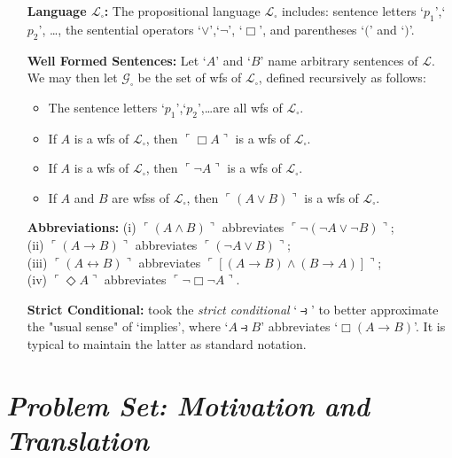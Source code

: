 \documentclass[a4paper, 11pt]{article} %
\newcommand{\corner}[1]{\ulcorner#1\urcorner} %
\renewcommand{\L}[0]{\mathcal{L}}
\begin{document}
\begin{enumerate}[leftmargin=1.2in,labelsep=.15in] 
\item[\bf Language $\boldsymbol{\L_\square}$:] The propositional language $\L_\square$ includes: sentence letters `$p_1$',`$p_2$', \dots, the sentential operators `$\vee$',`$\neg$', `$\Box$', and parentheses `$($' and `$)$'.
\item[\bf Well Formed Sentences:] Let `$A$' and `$B$' name arbitrary sentences of $\L$. We may then let $\mathcal{G}_\square$ be the set of wfs of $\L_\square$, defined recursively as follows:
\begin{itemize}
\item The sentence letters `$p_1$',`$p_2$',\dots are all wfs of $\L_\square$. 
\item If ${A}$ is a wfs of $\L_\square$, then $\corner{\Box A}$ is a wfs of $\L_\square$.
\item If ${A}$ is a wfs of $\L_\square$, then $\corner{\neg A}$ is a wfs of $\L_\square$.
\item If ${A}$ and ${B}$ are wfss of $\L_\square$, then $\corner{(A\vee B)}$ is a wfs of $\L_\square$.
\end{itemize}
\item[\bf Abbreviations:] (i) $\corner{(A\wedge B)}$ abbreviates $\corner{\neg(\neg A\vee\neg B)}$;\\ (ii) $\corner{(A\rightarrow B)}$ abbreviates $\corner{(\neg A\vee B)}$;\\ (iii) $\corner{(A\leftrightarrow B)}$ abbreviates $\corner{[(A\rightarrow B)\wedge(B\rightarrow A)]}$;\\ (iv) $\corner{\Diamond A}$ abbreviates $\corner{\neg\Box\neg A}$.
\item[\bf Strict Conditional:] \citet{Lewis1932} took the \textit{strict conditional} `$\strictif$' to better approximate the "usual sense" of `implies', where `$A\strictif B$' abbreviates `$\Box(A\rightarrow B)$'. It is typical to maintain the latter as standard notation. 
\end{enumerate}


\section*{\it Problem Set: Motivation and Translation}
\end{document}
